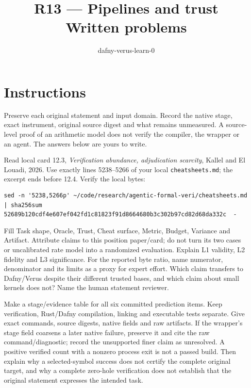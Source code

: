 \documentclass[11pt]{article}
\title{R13 --- Pipelines and trust \\ \large Written problems}
\author{dafny-verus-learn-0}
\date{}
\begin{document}
\maketitle
\sloppy
\section*{Instructions}
Preserve each original statement and input domain. Record the native stage,
exact instrument, original source digest and what remains unmeasured. A
source-level proof of an arithmetic model does not verify the compiler, the
wrapper or an agent. The answers below are yours to write.

\begin{problem}\label{prob:B1}
Read local card 12.3, \emph{Verification abundance, adjudication scarcity},
Kallel and El Louadi, 2026. Use exactly lines 5238--5266 of your local
\texttt{cheatsheets.md}; the excerpt ends before 12.4. Verify the local bytes:
\begin{verbatim}
sed -n '5238,5266p' ~/code/research/agentic-formal-veri/cheatsheets.md | sha256sum
52689b120cdf4e607ef042fd1c81823f91d8664680b3c302b97cd82d68da332c  -
\end{verbatim}
Fill Task shape, Oracle, Trust, Cheat surface, Metric, Budget, Variance and
Artifact. Attribute claims to this position paper/card; do not turn its two
cases or uncalibrated rate model into a randomized evaluation. Explain L1
validity, L2 fidelity and L3 significance. For the reported byte ratio, name
numerator, denominator and its limits as a proxy for expert effort. Which
claim transfers to Dafny/Verus despite their different trusted bases, and
which claim about small kernels does not? Name the human statement reviewer.
\end{problem}

\begin{problem}\label{prob:B2}
Make a stage/evidence table for all six committed prediction items. Keep
verification, Rust/Dafny compilation, linking and executable tests separate.
Give exact commands, source digests, native fields and raw artifacts. If the
wrapper's stage field coarsens a later native failure, preserve it and cite
the raw command/diagnostic; record the unsupported finer claim as unresolved.
A positive verified count with a nonzero process exit is not a passed build.
Then explain why a selected-symbol success does not certify the complete
original target, and why a complete zero-hole verification does not establish
that the original statement expresses the intended task.
\end{problem}
\end{document}
